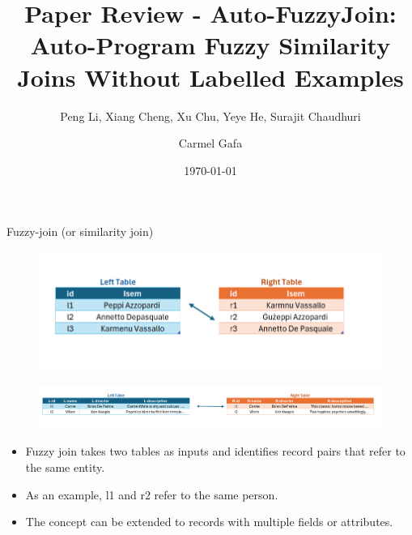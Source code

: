 \documentclass[8pt]{beamer} %
\title{Paper Review - Auto-FuzzyJoin: Auto-Program Fuzzy Similarity Joins Without Labelled Examples}
\subtitle{Peng Li, Xiang Cheng, Xu Chu, Yeye He, Surajit Chaudhuri}
\date{\today}
\author{Carmel Gafa}
\begin{document}
\begin{frame}[plain]
    \maketitle
\end{frame}

\small
\begin{frame}{Fuzzy-join (or similarity join)}
	\begin{figure}
		\centering
		\includegraphics[width=0.7\linewidth]{FuzzyJoin}
	\end{figure}

	\begin{figure}
		\centering
		\includegraphics[width=1\linewidth]{img/FuzzyJoin_2}
	\end{figure}

	\begin{itemize}
		\item Fuzzy join takes two tables as inputs and identifies record pairs that refer to the same entity.
		\item As an example, l1 and r2 refer to the same person.
		\item The concept can be extended to records with multiple fields or attributes.
	\end{itemize}
\end{frame}
\end{document}
